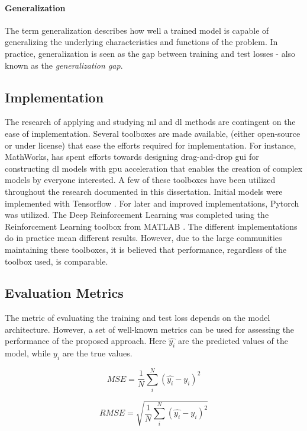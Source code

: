 \paragraph{Generalization}
The term generalization describes how well a trained model is capable of generalizing the underlying characteristics and functions of the problem. In practice, generalization is seen as the gap between training and test losses - also known as the \emph{generalization gap}. 

\subsection{Implementation}
The research of applying and studying \gls{ml} and \gls{dl} methods are contingent on the ease of implementation. Several toolboxes are made available, (either open-source or under license) that ease the efforts required for implementation. For instance, MathWorks, has spent efforts towards designing drag-and-drop \gls{gui} for constructing \gls{dl} models with \gls{gpu} acceleration that enables the creation of complex models by everyone interested. A few of these toolboxes have been utilized throughout the research documented in this dissertation. Initial models were implemented with Tensorflow \cite{tensorflow2015-whitepaper}. For later and improved implementations, Pytorch \cite{Paszke2017AutomaticPyTorch} was utilized. The Deep Reinforcement Learning was completed using the Reinforcement Learning toolbox from MATLAB \cite{MATLABRL_toolbox}. The different implementations do in practice mean different results. However, due to the large communities maintaining these toolboxes, it is believed that performance, regardless of the toolbox used, is comparable. 

\subsection{Evaluation Metrics}\label{subsec:eval_metrics}
The metric of evaluating the training and test loss depends on the model architecture. However, a set of well-known metrics can be used for assessing the performance of the proposed approach. Here $\hat{y_i}$ are the predicted values of the model, while $y_i$ are the true values.

\begin{equation}
    MSE =  \frac{1}{N} \sum_i^N (\hat{y_i} - y_i)^2
\end{equation}

\begin{equation}\label{eq:rmse}
    RMSE = \sqrt{\frac{1}{N} \sum_i^N (\hat{y_i} - y_i)^2}
\end{equation}

